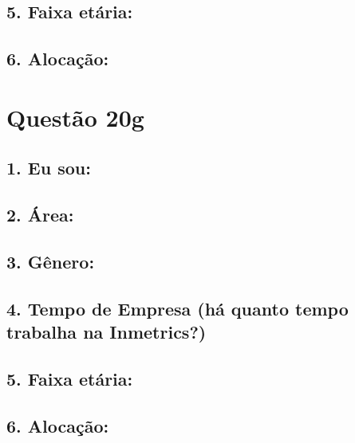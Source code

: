 \documentclass[]{book}
\begin{document}
\hypertarget{faixa-etaria-58}{%
\subsection{5. Faixa etária:}\label{faixa-etaria-58}}

\hypertarget{alocacao-58}{%
\subsection{6. Alocação:}\label{alocacao-58}}

\hypertarget{questao-20g}{%
\section{Questão 20g}\label{questao-20g}}

\hypertarget{eu-sou-59}{%
\subsection{1. Eu sou:}\label{eu-sou-59}}

\hypertarget{area-59}{%
\subsection{2. Área:}\label{area-59}}

\hypertarget{genero-59}{%
\subsection{3. Gênero:}\label{genero-59}}

\hypertarget{tempo-de-empresa-ha-quanto-tempo-trabalha-na-inmetrics-59}{%
\subsection{4. Tempo de Empresa (há quanto tempo trabalha na Inmetrics?)}\label{tempo-de-empresa-ha-quanto-tempo-trabalha-na-inmetrics-59}}

\hypertarget{faixa-etaria-59}{%
\subsection{5. Faixa etária:}\label{faixa-etaria-59}}

\hypertarget{alocacao-59}{%
\subsection{6. Alocação:}\label{alocacao-59}}
\end{document}
